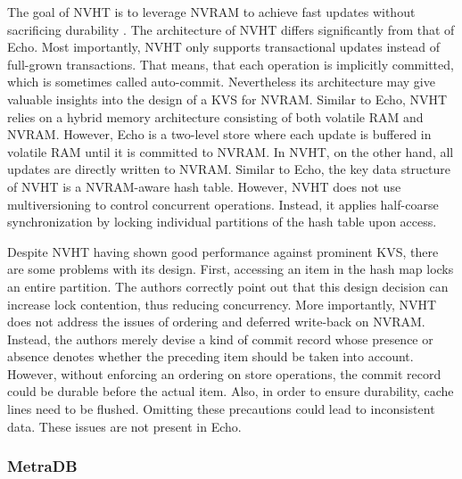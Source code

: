 The goal of NVHT is to leverage NVRAM to achieve fast updates without
sacrificing durability \cite{zhou2016nvht}. The architecture of NVHT differs
significantly from that of Echo. Most importantly, NVHT only supports
transactional updates instead of full-grown transactions. That means, that each
operation is implicitly committed, which is sometimes called auto-commit.
Nevertheless its architecture may give valuable insights into the design of a
KVS for NVRAM. Similar to Echo, NVHT relies on a hybrid memory architecture
consisting of both volatile RAM and NVRAM. However, Echo is a two-level store
where each update is buffered in volatile RAM until it is committed to NVRAM. In
NVHT, on the other hand, all updates are directly written to NVRAM. Similar to
Echo, the key data structure of NVHT is a NVRAM-aware hash table. However, NVHT
does not use multiversioning to control concurrent operations. Instead, it
applies half-coarse synchronization by locking individual partitions of the hash
table upon access.

Despite NVHT having shown good performance against prominent KVS, there are some
problems with its design. First, accessing an item in the hash map locks an
entire partition. The authors correctly point out that this design decision can
increase lock contention, thus reducing concurrency. More importantly, NVHT does
not address the issues of ordering and deferred write-back on NVRAM. Instead,
the authors merely devise a kind of commit record whose presence or absence
denotes whether the preceding item should be taken into account. However,
without enforcing an ordering on store operations, the commit record could be
durable before the actual item. Also, in order to ensure durability, cache lines
need to be flushed. Omitting these precautions could lead to inconsistent data.
These issues are not present in Echo.

\subsubsection{MetraDB}

